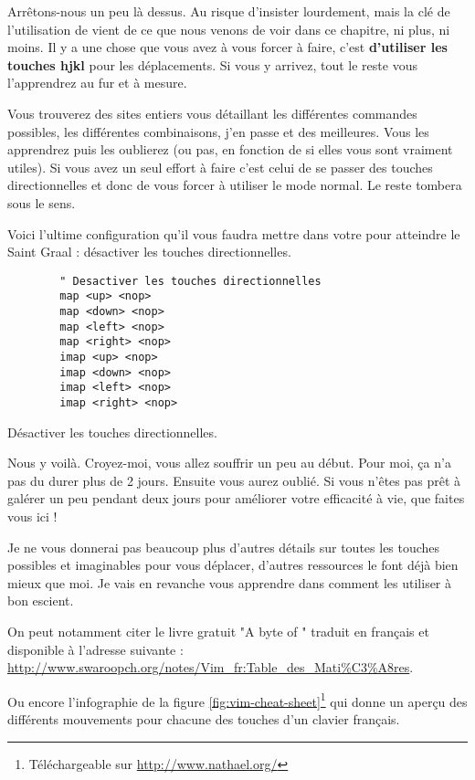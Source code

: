 Arrêtons-nous un peu là dessus. Au risque d'insister lourdement, mais la clé de l'utilisation de \vim vient de ce que nous venons de voir dans ce chapitre, ni plus, ni moins. Il y a une chose que vous avez à vous forcer à faire, c'est \textbf{d'utiliser les touches hjkl} pour les déplacements. Si vous y arrivez, tout le reste vous l'apprendrez au fur et à mesure.

Vous trouverez des sites entiers vous détaillant les différentes commandes possibles, les différentes combinaisons, j'en passe et des meilleures. Vous les apprendrez puis les oublierez (ou pas, en fonction de si elles vous sont vraiment utiles). Si vous avez un seul effort à faire c'est celui de se passer des touches directionnelles et donc de vous forcer à utiliser le mode normal. Le reste tombera sous le sens.

Voici l'ultime configuration qu'il vous faudra mettre dans votre \vimrc pour atteindre le Saint Graal : désactiver les touches directionnelles.

\begin{listing}[H]

    \begin{verbatim}
        " Desactiver les touches directionnelles
        map <up> <nop>
        map <down> <nop>
        map <left> <nop>
        map <right> <nop>
        imap <up> <nop>
        imap <down> <nop>
        imap <left> <nop>
        imap <right> <nop>
    \end{verbatim}
    \caption{Désactiver les touches directionnelles.}
    \label{code:touches-directionnelles}
\end{listing}

Nous y voilà. Croyez-moi, vous allez souffrir un peu au début. Pour moi, ça n'a pas du durer plus de 2 jours. Ensuite vous aurez oublié. Si vous n'êtes pas prêt à galérer un peu pendant deux jours pour améliorer votre efficacité à vie, que faites vous ici !

Je ne vous donnerai pas beaucoup plus d'autres détails sur toutes les touches possibles et imaginables pour vous déplacer, d'autres ressources le font déjà bien mieux que moi. Je vais en revanche vous apprendre dans  comment les utiliser à bon escient.

On peut notamment citer le livre gratuit "A byte of \vim" traduit en français et disponible à l'adresse suivante : \url{http://www.swaroopch.org/notes/Vim_fr:Table_des_Mati\%C3\%A8res}.

Ou encore l'infographie de la figure \ref{fig:vim-cheat-sheet}\footnote{Téléchargeable sur \url{http://www.nathael.org/}} qui donne un aperçu des différents mouvements pour chacune des touches d'un clavier français.

